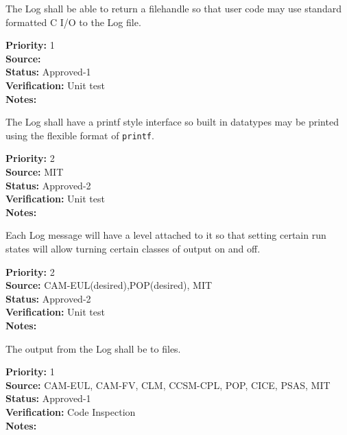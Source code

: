 
The Log shall be able to return a filehandle so that user code may use standard
formatted C I/O to the Log file.

\begin{reqlist}
{\bf Priority:} 1 \\
{\bf Source:} \\
{\bf Status:} Approved-1 \\
{\bf Verification:} Unit test \\
{\bf Notes:} 
\end{reqlist}


The Log shall have a printf style interface so built in datatypes may be 
printed using the flexible format of {\tt printf}.

\begin{reqlist}
{\bf Priority:} 2 \\
{\bf Source:} MIT \\
{\bf Status:} Approved-2 \\
{\bf Verification:} Unit test \\
{\bf Notes:} 
\end{reqlist}

Each Log message will have a level attached to it so that setting certain run
states will allow turning certain classes of output on and off.

\begin{reqlist}
{\bf Priority:} 2\\
{\bf Source:} CAM-EUL(desired),POP(desired), MIT \\
{\bf Status:} Approved-2 \\
{\bf Verification:} Unit test \\
{\bf Notes:} 
\end{reqlist}

The output from the Log shall be to files.

\begin{reqlist}
{\bf Priority:} 1 \\
{\bf Source:} CAM-EUL, CAM-FV, CLM, CCSM-CPL, POP, CICE, PSAS, MIT  \\
{\bf Status:} Approved-1 \\
{\bf Verification:} Code Inspection \\
{\bf Notes:} 
\end{reqlist}

